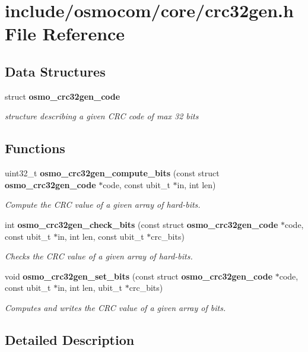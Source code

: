 \section{include/osmocom/core/crc32gen.h File Reference}
\label{crc32gen_8h}
\subsection*{Data Structures}
\begin{DoxyCompactItemize}
\item 
struct {\bf osmo\_\-crc32gen\_\-code}
\begin{DoxyCompactList}\small\item\em structure describing a given CRC code of max 32 bits \item\end{DoxyCompactList}\end{DoxyCompactItemize}
\subsection*{Functions}
\begin{DoxyCompactItemize}
\item 
uint32\_\-t {\bf osmo\_\-crc32gen\_\-compute\_\-bits} (const struct {\bf osmo\_\-crc32gen\_\-code} $\ast$code, const ubit\_\-t $\ast$in, int len)
\begin{DoxyCompactList}\small\item\em Compute the CRC value of a given array of hard-\/bits. \item\end{DoxyCompactList}\item 
int {\bf osmo\_\-crc32gen\_\-check\_\-bits} (const struct {\bf osmo\_\-crc32gen\_\-code} $\ast$code, const ubit\_\-t $\ast$in, int len, const ubit\_\-t $\ast$crc\_\-bits)
\begin{DoxyCompactList}\small\item\em Checks the CRC value of a given array of hard-\/bits. \item\end{DoxyCompactList}\item 
void {\bf osmo\_\-crc32gen\_\-set\_\-bits} (const struct {\bf osmo\_\-crc32gen\_\-code} $\ast$code, const ubit\_\-t $\ast$in, int len, ubit\_\-t $\ast$crc\_\-bits)
\begin{DoxyCompactList}\small\item\em Computes and writes the CRC value of a given array of bits. \item\end{DoxyCompactList}\end{DoxyCompactItemize}


\subsection{Detailed Description}
